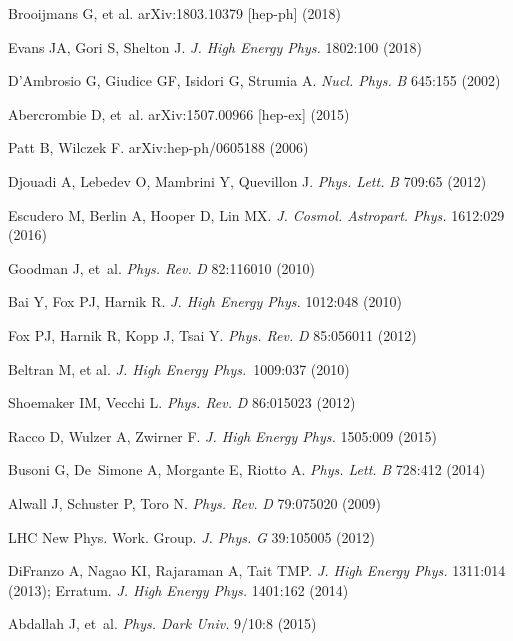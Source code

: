 \documentclass{ar-1col}
\begin{document}
{\begin{thebibliography}{175}
  Brooijmans G, {et al.} arXiv:1803.10379 [hep-ph] (2018)

Evans JA, Gori S, Shelton J. \textit{J. High Energy Phys.} {1802}:100 (2018)

D'Ambrosio G, Giudice GF, Isidori G, Strumia A. \textit{Nucl.
Phys.} \textit{B} 645:155 (2002)

Abercrombie D, et~al. arXiv:1507.00966 [hep-ex] (2015)

Patt B, Wilczek F. arXiv:hep-ph/0605188 (2006)

Djouadi A, Lebedev O, Mambrini Y, Quevillon J. \textit{Phys.
Lett.} \textit{B} 709:65 (2012)


Escudero M, Berlin A, Hooper D, Lin MX. \textit{J. Cosmol. Astropart. Phys.} 1612:029
(2016)

Goodman J, et~al. \textit{Phys. Rev.} \textit{D} 82:116010 (2010)

Bai Y, Fox PJ, Harnik R. \textit{J. High Energy Phys.} 1012:048 (2010)

Fox PJ, Harnik R, Kopp J, Tsai Y. \textit{Phys. Rev.} \textit{D} 85:056011
(2012)

  Beltran M, et al.
\textit{J. High Energy Phys.}\ {1009}:037 (2010)

Shoemaker IM, Vecchi L. \textit{Phys. Rev.} \textit{D} 86:015023 (2012)

Racco D, Wulzer A, Zwirner F. \textit{J. High Energy Phys.} 1505:009 (2015)

Busoni G, De~Simone A, Morgante E, Riotto A. \textit{Phys. Lett.}
\textit{B} 728:412 (2014)



Alwall J, Schuster P, Toro N. \textit{Phys. Rev.} \textit{D} 79:075020
(2009)

{LHC New Phys. Work. Group}. \textit{J. Phys.} \textit{G} 39:105005
(2012)

  DiFranzo A, Nagao KI, Rajaraman A, Tait TMP.
  \textit{J. High Energy Phys.} {1311}:014 (2013);
  Erratum. \textit{J. High Energy Phys.} {1401}:162 (2014)

Abdallah J, et~al. \textit{Phys. Dark Univ.} 9/10:8 (2015)


\end{thebibliography}}
\end{document}
